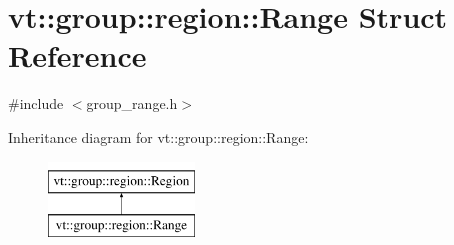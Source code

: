 \hypertarget{structvt_1_1group_1_1region_1_1_range}{}\section{vt\+:\+:group\+:\+:region\+:\+:Range Struct Reference}
\label{structvt_1_1group_1_1region_1_1_range}


{\ttfamily \#include $<$group\+\_\+range.\+h$>$}

Inheritance diagram for vt\+:\+:group\+:\+:region\+:\+:Range\+:\begin{figure}[H]
\begin{center}
\leavevmode
\includegraphics[height=2.000000cm]{structvt_1_1group_1_1region_1_1_range}
\end{center}
\end{figure}
